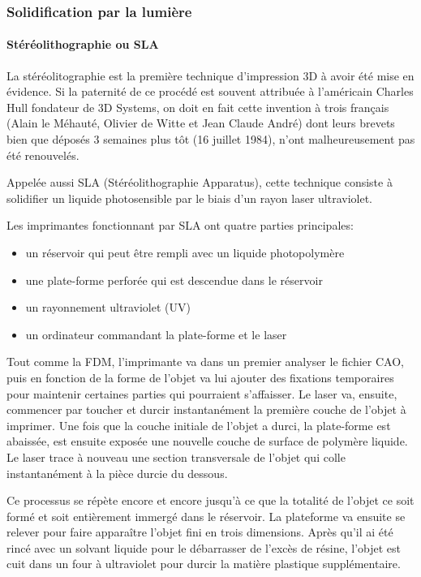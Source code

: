 \documentclass{article}
\begin{document}
\subsubsection{Solidification par la lumière}
\paragraph{Stéréolithographie ou SLA} \hfill

La stéréolitographie est la première technique d'impression 3D à avoir été mise en évidence.
Si la paternité de ce procédé est souvent attribuée à l'américain Charles Hull fondateur de 3D Systems, on doit en fait cette invention à trois français (Alain le Méhauté, Olivier de Witte et Jean Claude André) dont leurs brevets bien que déposés 3 semaines plus tôt (16 juillet 1984), n'ont malheureusement pas été renouvelés. \hfill

Appelée aussi SLA (Stéréolithographie Apparatus), cette technique consiste à solidifier un liquide photosensible par le biais d'un rayon laser ultraviolet.

Les imprimantes fonctionnant par SLA ont quatre parties principales:
\begin{itemize}
\item un réservoir qui peut être rempli avec un liquide photopolymère
\item une plate-forme perforée qui est descendue dans le réservoir
\item un rayonnement ultraviolet (UV)
\item un ordinateur commandant la plate-forme et le laser
\end{itemize}\hfil

Tout comme la FDM, l'imprimante va dans un premier analyser le fichier CAO, puis en fonction de la forme de l'objet va lui ajouter des fixations temporaires pour maintenir certaines parties qui pourraient s'affaisser. Le laser va, ensuite, commencer par toucher et durcir instantanément la première couche de l'objet à imprimer. Une fois que la couche initiale de l'objet a durci, la plate-forme est abaissée, est ensuite exposée une nouvelle couche de surface de polymère liquide. Le laser trace à nouveau une section transversale de l'objet qui colle instantanément à la pièce durcie du dessous.\hfill

Ce processus se répète encore et encore jusqu'à ce que la totalité de l'objet ce soit formé et soit entièrement immergé dans le réservoir. La plateforme va ensuite se relever pour faire apparaître l'objet fini en trois dimensions. Après qu'il ai été rincé avec un solvant liquide pour le débarrasser de l'excès de résine, l'objet est cuit dans un four à ultraviolet pour durcir la matière plastique supplémentaire.\hfill
\end{document}
